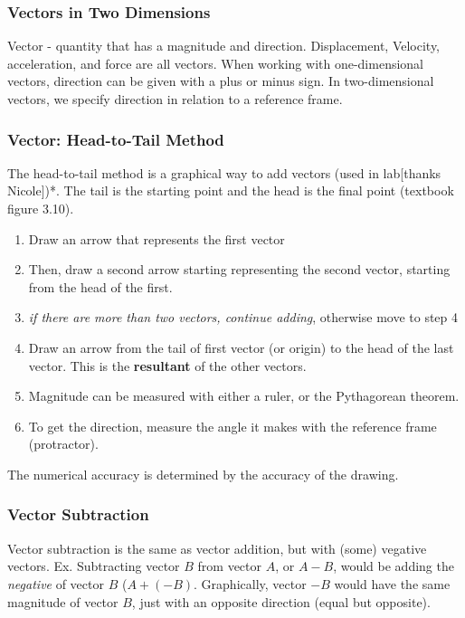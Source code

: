 \documentclass{article}
\begin{document}
\subsubsection{Vectors in Two Dimensions}
Vector - quantity that has a magnitude and direction.
Displacement, Velocity, acceleration, and force are all vectors.
When working with one-dimensional vectors, direction can be given with a plus or minus sign.
In two-dimensional vectors, we specify direction in relation to a reference frame.

\subsubsection{Vector: Head-to-Tail Method}
The head-to-tail method is a graphical way to add vectors (used in lab[thanks Nicole])*. The tail is the starting point and the head is the final point (textbook figure 3.10).

\begin{enumerate}
\item Draw an arrow that represents the first vector
\item Then, draw a second arrow starting representing the second vector, starting from the head of the first.
\item \emph{if there are more than two vectors, continue adding}, otherwise move to step 4
\item Draw an arrow from the tail of first vector (or origin) to the head of the last vector. This is the \textbf{resultant} of the other vectors.
\item Magnitude can be measured with either a ruler, or the Pythagorean theorem.
\item To get the direction, measure the angle it makes with the reference frame (protractor).  
\end{enumerate}

The numerical accuracy is determined by the accuracy of the drawing.

\subsubsection{Vector Subtraction}
Vector subtraction is the same as vector addition, but with (some) vegative vectors. Ex. Subtracting vector $B$ from vector $A$, or $A-B$, would be adding the \emph{negative} of vector $B$ ($A + (-B)$. Graphically, vector $-B$ would have the same magnitude of vector $B$, just with an opposite direction (equal but opposite).
\end{document}
